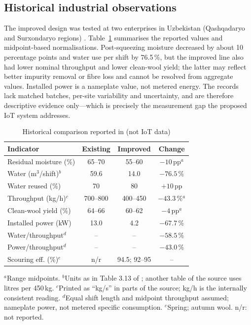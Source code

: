 \documentclass[journal]{IEEEtran}
\begin{document}
\subsection{Historical industrial observations}
The improved design was tested at two enterprises in Uzbekistan
(Qashqadaryo and Surxondaryo regions) \cite{tuguzbayeva2024}. Table~\ref{tab:hist} summarises the reported values and
midpoint-based normalisations. Post-squeezing moisture decreased by about 10 percentage points and water use per shift by
76.5\,\%, but the improved line also had lower nominal throughput and lower clean-wool yield; the latter may reflect
better impurity removal or fibre loss and cannot be resolved from aggregate values. Installed power is a nameplate value,
not metered energy. The records lack matched batches, per-site variability and uncertainty, and are therefore
descriptive evidence only---which is precisely the measurement gap the proposed IoT system addresses.

\begin{table}[t]\centering\small
\caption{Historical comparison reported in \cite{tuguzbayeva2024} (not IoT data)}
\label{tab:hist}
\setlength{\tabcolsep}{2.5pt}
\begin{tabular}{lccc}\toprule
Indicator & Existing & Improved & Change\\\midrule
Residual moisture (\%) & 65--70 & 55--60 & $-10$\,pp$^a$\\
Water (m$^3$/shift)$^b$ & 59.6 & 14.0 & $-76.5$\,\%\\
Water reused (\%) & 70 & 80 & $+10$\,pp\\
Throughput (kg/h)$^c$ & 700--800 & 400--450 & $-43.3$\,\%$^a$\\
Clean-wool yield (\%) & 64--66 & 60--62 & $-4$\,pp$^a$\\
Installed power (kW) & 13.0 & 4.2 & $-67.7$\,\%\\
Water/throughput$^d$ & -- & -- & $-58.5$\,\%\\
Power/throughput$^d$ & -- & -- & $-43.0$\,\%\\
Scouring eff. (\%)$^e$ & n/r & 94.5; 92--95 & --\\\bottomrule
\end{tabular}

\vspace{2pt}
\parbox{\columnwidth}{\scriptsize $^a$Range midpoints. $^b$Units as in Table 3.13 of \cite{tuguzbayeva2024}; another
table of the source uses litres per 450\,kg. $^c$Printed as ``kg/s'' in parts of the source; kg/h is the internally
consistent reading. $^d$Equal shift length and midpoint throughput assumed; nameplate power, not metered specific
consumption. $^e$Spring; autumn wool. n/r: not reported.}
\end{table}
\end{document}
